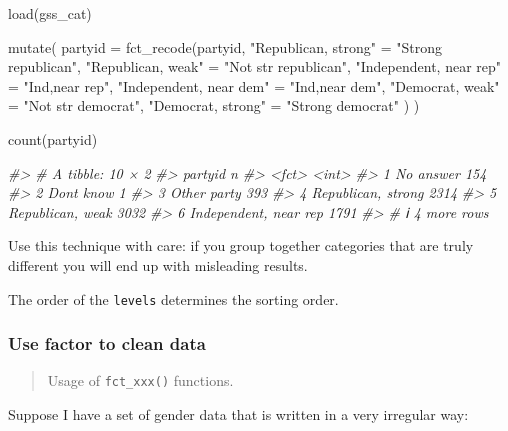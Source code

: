 \documentclass[
]{article}
\newenvironment{Shaded}{}{}
\newcommand{\AttributeTok}[1]{\textcolor[rgb]{0.49,0.56,0.16}{#1}}
\newcommand{\CommentTok}[1]{\textcolor[rgb]{0.38,0.63,0.69}{\textit{#1}}}
\newcommand{\FunctionTok}[1]{\textcolor[rgb]{0.02,0.16,0.49}{#1}}
\newcommand{\NormalTok}[1]{#1}
\newcommand{\OtherTok}[1]{\textcolor[rgb]{0.00,0.44,0.13}{#1}}
\newcommand{\StringTok}[1]{\textcolor[rgb]{0.25,0.44,0.63}{#1}}
\begin{document}
\begin{Shaded}
\begin{Highlighting}[]
\FunctionTok{load}\NormalTok{(gss\_cat)}

\FunctionTok{mutate}\NormalTok{(}
  \AttributeTok{partyid =} \FunctionTok{fct\_recode}\NormalTok{(partyid,}
    \StringTok{"Republican, strong"}    \OtherTok{=} \StringTok{"Strong republican"}\NormalTok{,}
    \StringTok{"Republican, weak"}      \OtherTok{=} \StringTok{"Not str republican"}\NormalTok{,}
    \StringTok{"Independent, near rep"} \OtherTok{=} \StringTok{"Ind,near rep"}\NormalTok{,}
    \StringTok{"Independent, near dem"} \OtherTok{=} \StringTok{"Ind,near dem"}\NormalTok{,}
    \StringTok{"Democrat, weak"}        \OtherTok{=} \StringTok{"Not str democrat"}\NormalTok{,}
    \StringTok{"Democrat, strong"}      \OtherTok{=} \StringTok{"Strong democrat"}
\NormalTok{  )}
\NormalTok{) }

\FunctionTok{count}\NormalTok{(partyid)}

\CommentTok{\#\textgreater{} \# A tibble: 10 × 2}
\CommentTok{\#\textgreater{}   partyid                   n}
\CommentTok{\#\textgreater{}   \textless{}fct\textgreater{}                 \textless{}int\textgreater{}}
\CommentTok{\#\textgreater{} 1 No answer               154}
\CommentTok{\#\textgreater{} 2 Don\textquotesingle{}t know                1}
\CommentTok{\#\textgreater{} 3 Other party             393}
\CommentTok{\#\textgreater{} 4 Republican, strong     2314}
\CommentTok{\#\textgreater{} 5 Republican, weak       3032}
\CommentTok{\#\textgreater{} 6 Independent, near rep  1791}
\CommentTok{\#\textgreater{} \# ℹ 4 more rows}
\end{Highlighting}
\end{Shaded}

Use this technique with care: if you group together categories that are
truly different you will end up with misleading results.

The order of the \texttt{levels} determines the sorting order.

\hypertarget{use-factor-to-clean-data}{%
\subsubsection{Use factor to clean
data}\label{use-factor-to-clean-data}}

\begin{quote}
Usage of \texttt{fct\_xxx()} functions.
\end{quote}

Suppose I have a set of gender data that is written in a very irregular
way:
\end{document}
